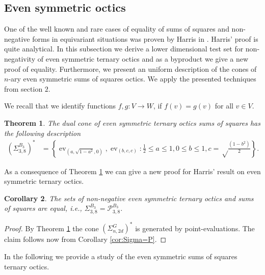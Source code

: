 \documentclass[11pt,a4paper]{amsart}
\numberwithin{equation}{section}
\newtheorem{thm}{Theorem}
\newtheorem{cor}[thm]{Corollary}
\theoremstyle{definition}
\DeclareMathOperator{\ev}{ev}
\numberwithin{thm}{section}
\theoremstyle{break}
\numberwithin{subcase}{case}
\begin{document}
\subsection{Even symmetric octics}\label{sec:even}
One of the well known and rare cases of equality of sums of squares and non-negative forms in equivariant situations was proven by Harris in \cite{harris1999real}. Harris' proof is quite analytical. In this subsection we derive a lower dimensional test set for non-negativity of even symmetric ternary octics and as a byproduct we give a new proof of equality. Furthermore, we present an uniform description of the cones of $n$-ary even symmetric sums of squares octics. We apply the presented techniques from section $2$. 

We recall that we identify functions $f,g:V \rightarrow W$, if $f(v)=g(v)$ for all $v \in V$.


 \begin{thm} \label{Thm:DualEvenSymOct} The dual cone of even symmetric ternary octics sums of squares has the following description
 \begin{align*}
     \left( \Sigma_{3,8}^{B_3} \right)^\ast
     & = \left\{\ev_{\left(a,\sqrt{1-a^2},0\right)},\ev_{(b,c,c)} : \frac{1}{2} \leq a \leq 1, 0 \leq b \leq 1, c = \sqrt\frac{{(1-b^2)}}{{2}}\right\}.
 \end{align*}
  \end{thm}


As a consequence of Theorem \ref{Thm:DualEvenSymOct} we can give a new proof for Harris' result on even symmetric ternary octics.
\begin{cor}\cite[Theorem 4.1]{harris1999real}\label{COR Harris} The sets of non-negative even symmetric ternary octics and sums of squares are equal, i.e.,
$\Sigma_{3,8}^{B_3} = \mathcal{P}_{3,8}^{B_3}$.
\end{cor}
\begin{proof}
By Theorem \ref{Thm:DualEvenSymOct} the cone $\left( \Sigma_{n,2d}^G\right)^\ast$ is generated by point-evaluations. The claim follows now from Corollary \ref{cor:Sigma=P}.
\end{proof}
In the following we provide a study of the even symmetric sums of squares ternary octics.
\end{document}
